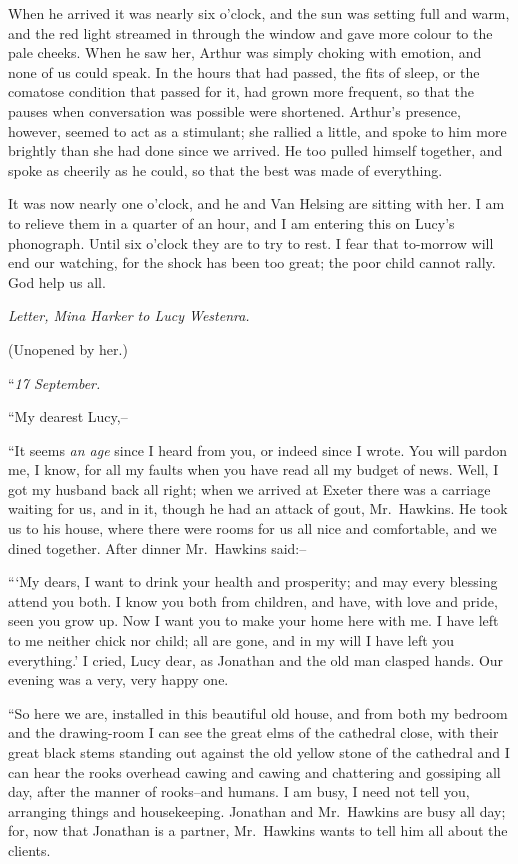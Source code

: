 \documentclass[12pt,openright]{book}
\begin{document}
When he arrived it was nearly six o’clock, and the sun was setting full and warm, and the red light streamed in through the window and gave more colour to the pale cheeks. When he saw her, Arthur was simply choking with emotion, and none of us could speak. In the hours that had passed, the fits of sleep, or the comatose condition that passed for it, had grown more frequent, so that the pauses when conversation was possible were shortened. Arthur’s presence, however, seemed to act as a stimulant; she rallied a little, and spoke to him more brightly than she had done since we arrived. He too pulled himself together, and spoke as cheerily as he could, so that the best was made of everything.

It was now nearly one o’clock, and he and Van Helsing are sitting with her. I am to relieve them in a quarter of an hour, and I am entering this on Lucy’s phonograph. Until six o’clock they are to try to rest. I fear that to-morrow will end our watching, for the shock has been too great; the poor child cannot rally. God help us all.

\textit{Letter, Mina Harker to Lucy Westenra.}

(Unopened by her.)

“\textit{17 September.}

“My dearest Lucy,–

“It seems \textit{an age} since I heard from you, or indeed since I wrote. You will pardon me, I know, for all my faults when you have read all my budget of news. Well, I got my husband back all right; when we arrived at Exeter there was a carriage waiting for us, and in it, though he had an attack of gout, Mr. Hawkins. He took us to his house, where there were rooms for us all nice and comfortable, and we dined together. After dinner Mr. Hawkins said:–

“‘My dears, I want to drink your health and prosperity; and may every blessing attend you both. I know you both from children, and have, with love and pride, seen you grow up. Now I want you to make your home here with me. I have left to me neither chick nor child; all are gone, and in my will I have left you everything.’ I cried, Lucy dear, as Jonathan and the old man clasped hands. Our evening was a very, very happy one.

“So here we are, installed in this beautiful old house, and from both my bedroom and the drawing-room I can see the great elms of the cathedral close, with their great black stems standing out against the old yellow stone of the cathedral and I can hear the rooks overhead cawing and cawing and chattering and gossiping all day, after the manner of rooks–and humans. I am busy, I need not tell you, arranging things and housekeeping. Jonathan and Mr. Hawkins are busy all day; for, now that Jonathan is a partner, Mr. Hawkins wants to tell him all about the clients.
\end{document}
